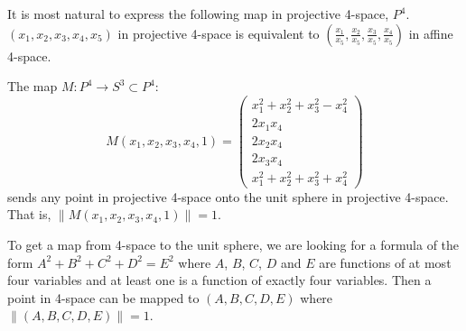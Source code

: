 \begin{notation}
It is most natural to express the following map in projective 4-space, $P^4$.
$(x_1,x_2,x_3,x_4,x_5)$ in projective 4-space is equivalent to
$(\frac{x_1}{x_5},\frac{x_2}{x_5},\frac{x_3}{x_5},\frac{x_4}{x_5})$ 
in affine 4-space.
\end{notation}

\begin{corollary}
The map $M:P^4 \rightarrow S^3 \subset P^4$:
\begin{equation}
\label{eq:M}
	M(x_1,x_2,x_3,x_4,1) = \left( \begin{array}{c}
		x_1^2+x_2^2+x_3^2-x_4^2 \\
		2x_1x_4 \\
		2x_2x_4 \\
		2x_3x_4 \\
		x_1^2+x_2^2+x_3^2+x_4^2
		\end{array} \right)
\end{equation}
sends any point in projective 4-space onto the unit sphere in projective
4-space.
That is, $\| M(x_1,x_2,x_3,x_4,1) \| = 1$.
\end{corollary}

\begin{rmk}
To get a map from 4-space to the unit sphere,
we are looking for a formula of the form $A^2+B^2+C^2+D^2=E^2$
where $A$, $B$, $C$, $D$ and $E$ are functions of at most four variables
and at least one is a function of exactly four variables.
Then a point in 4-space can be
mapped to $(A,B,C,D,E)$ where $\|(A,B,C,D,E)\| = 1$.
\end{rmk}


